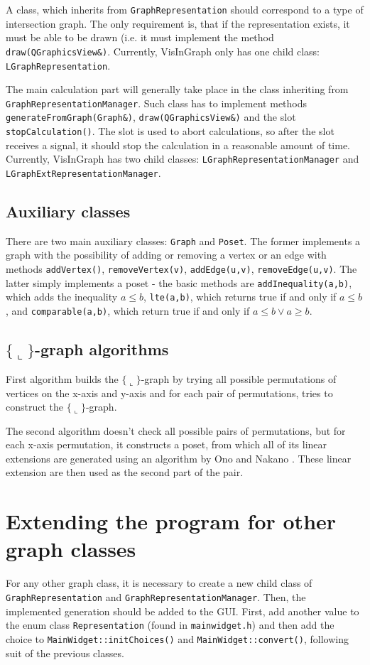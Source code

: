 \documentclass{article}
\begin{document}
A class, which inherits from \texttt{GraphRepresentation} should correspond to a type of intersection graph.
The only requirement is, that if the representation exists, it must be able to be drawn (i.e. it must implement the method \texttt{draw(QGraphicsView\&)}.
Currently, VisInGraph only has one child class: \texttt{LGraphRepresentation}.

The main calculation part will generally take place in the class inheriting from \texttt{GraphRepresentationManager}.
Such class has to implement methods \texttt{generateFromGraph(Graph\&)}, \texttt{draw(QGraphicsView\&)} and the slot \texttt{stopCalculation()}.
The slot is used to abort calculations, so after the slot receives a signal, it should stop the calculation in a reasonable amount of time.
Currently, VisInGraph has two child classes: \texttt{LGraphRepresentationManager} and \texttt{LGraphExtRepresentationManager}.


\subsection{Auxiliary classes}
There are two main auxiliary classes: \texttt{Graph} and \texttt{Poset}.
The former implements a graph with the possibility of adding or removing a vertex or an edge with methods \texttt{addVertex()}, \texttt{removeVertex(v)}, \texttt{addEdge(u,v)}, \texttt{removeEdge(u,v)}.
The latter simply implements a poset - the basic methods are \texttt{addInequality(a,b)}, which adds the inequality $a\leq b$, \texttt{lte(a,b)}, which returns true if and only if $a\leq b$, and \texttt{comparable(a,b)}, which return true if and only if $a\leq b\lor a\geq b$.


\subsection{$\{\llcorner\}$-graph algorithms}
First algorithm builds the $\{\llcorner\}$-graph by trying all possible permutations of vertices on the x-axis and y-axis and for each pair of permutations, tries to construct the $\{\llcorner\}$-graph.

The second algorithm doesn't check all possible pairs of permutations, but for each x-axis permutation, it constructs a poset, from which all of its linear extensions are generated using an algorithm by Ono and Nakano \cite{posetAlgo}.
These linear extension are then used as the second part of the pair.


\section{Extending the program for other graph classes}
For any other graph class, it is necessary to create a new child class of \texttt{GraphRepresentation} and \texttt{GraphRepresentationManager}.
Then, the implemented generation should be added to the GUI.
First, add another value to the enum class \texttt{Representation} (found in \texttt{mainwidget.h}) and then add the choice to \texttt{MainWidget::initChoices()} and \texttt{MainWidget::convert()}, following suit of the previous classes.



\end{document}
